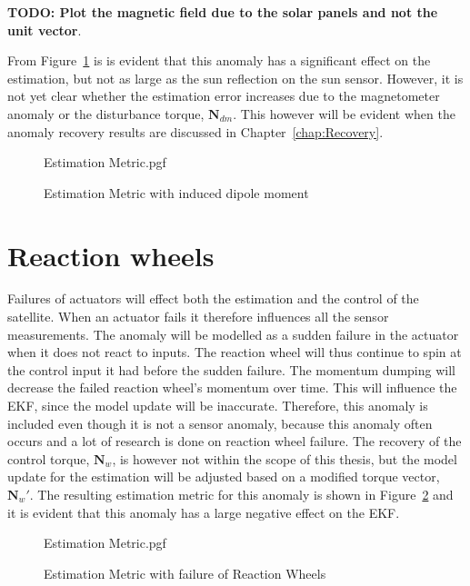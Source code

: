 \textbf{TODO: Plot the magnetic field due to the solar panels and not the unit vector}.

From Figure~\ref{fig:solarPanelDipoleOnEstimation} is is evident that this anomaly has a significant effect on the estimation, but not as large as the sun reflection on the sun sensor. However, it is not yet clear whether the estimation error increases due to the magnetometer anomaly or the disturbance torque, $\mathbf{N}_{dm}$. This however will be evident when the anomaly recovery results are discussed in Chapter~\ref{chap:Recovery}.

\begin{figure}[!htb]
	\centering
	
	{Estimation Metric.pgf}
	
	\caption{Estimation Metric with induced dipole moment}
	\label{fig:solarPanelDipoleOnEstimation}
\end{figure}

\section{Reaction wheels}
Failures of actuators will effect both the estimation and the control of the satellite. When an actuator fails it therefore influences all the sensor measurements. The anomaly will be modelled as a sudden failure in the actuator when it does not react to inputs. The reaction wheel will thus continue to spin at the control input it had before the sudden failure. The momentum dumping will decrease the failed reaction wheel's momentum over time. This will influence the EKF, since the model update will be inaccurate. Therefore, this anomaly is included even though it is not a sensor anomaly, because this anomaly often occurs and a lot of research is done on reaction wheel failure. The recovery of the control torque, $\mathbf{N}_w$, is however not within the scope of this thesis, but the model update for the estimation will be adjusted based on a modified torque vector, $\mathbf{N}_w'$. The resulting estimation metric for this anomaly is shown in Figure~\ref{fig:catastrophicReactionWheels} and it is evident that this anomaly has a large negative effect on the EKF.

\begin{figure}[!htb]
\centering

{Estimation Metric.pgf}

\caption{Estimation Metric with failure of Reaction Wheels}
\label{fig:catastrophicReactionWheels}
\end{figure}

